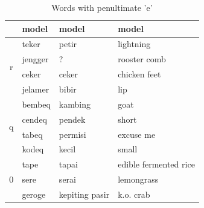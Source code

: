 \documentclass[12pt]{ouparticle}
\begin{document}
\begin{table}[]
\begin{tabular}{c|l l l}
                       & model & model   & model \\
    \hline 
    \multirow{4}{*}{r} & teker & petir & lightning\\
                       & jengger & ? & rooster comb\\
                       & ceker & ceker & chicken feet\\
                       & jelamer & bibir   & lip \\
    \hline    
    \multirow{4}{*}{q} & bembeq & kambing & goat\\
                       & cendeq & pendek & short\\
                       & tabeq & permisi & excuse me\\
                       & kodeq & kecil   & small \\
    \hline
    \multirow{3}{*}{0} & tape & tapai & edible fermented rice\\
                       & sere & serai & lemongrass\\
                       & geroge & kepiting pasir & k.o. crab\\
    \end{tabular}
    \caption{Words with penultimate 'e'}
    \label{tab:my_label}
\end{table}
\end{document}
